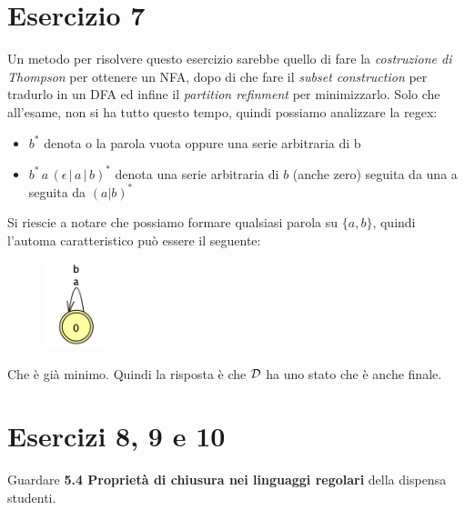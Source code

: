 \documentclass[11pt]{article}
\begin{document}
\section*{Esercizio 7}
Un metodo per risolvere questo esercizio sarebbe quello di fare la \textit{costruzione
di Thompson} per ottenere un NFA, dopo di che fare il \textit{subset construction} per tradurlo in un DFA ed infine il \textit{partition refinment} per minimizzarlo.
Solo che all'esame, non si ha tutto questo tempo, quindi possiamo analizzare la regex:
\begin{itemize}
  \item $b^*$ denota o la parola vuota oppure una serie arbitraria di b
  \item $b^*\,a\,(\epsilon\,|\,a\,|\,b)^*$ denota una serie arbitraria di $b$ (anche zero) seguita da una a seguita da $(a | b)^*$
\end{itemize}
Si riescie a notare che possiamo formare qualsiasi parola su $\{a, b\}$, quindi l'automa caratteristico può essere il seguente:
\begin{figure}[H]
  \centering
  \includegraphics[height=2.5cm]{img/07DFA.png}
  \label{fig:07-DFA}
\end{figure}
\noindent Che è già minimo. Quindi la risposta è che $\cal D$ ha uno stato che è anche finale.

\section*{Esercizi 8, 9 e 10}
Guardare \textbf{5.4 Proprietà di chiusura nei linguaggi regolari} della dispensa studenti.
\end{document}

